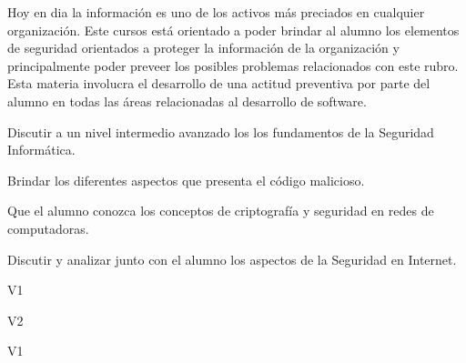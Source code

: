 \begin{syllabus}


\begin{justification}
Hoy en dia la información es uno de los activos más preciados en cualquier organización.
Este cursos está orientado a poder brindar al alumno los elementos de seguridad orientados a proteger la
información de la organización y principalmente poder preveer los posibles problemas relacionados con este rubro.
Esta materia involucra el desarrollo de una actitud preventiva por parte del alumno en todas las áreas
relacionadas al desarrollo de software.
\end{justification}

\begin{goals}
\item Discutir a un nivel intermedio avanzado los los fundamentos de la Seguridad Informática.
\item Brindar los diferentes aspectos que presenta el código malicioso.
\item Que el alumno conozca los conceptos de criptografía y seguridad en redes de computadoras.
\item Discutir y analizar junto con el alumno los aspectos de la Seguridad en Internet.
\end{goals}

\begin{outcomes}{V1}
    \item {}
    \item {}
    \item {}
    \item {}
    \item {}
    \item {}
\end{outcomes}

\begin{outcomes}{V2}
    \item {}
    \item {}
\end{outcomes}

\begin{competences}{V1}
    \item {}
    \item {}
    \item {}
    \item {}
    \item {}
    \item {}
    \item {}
    \item {}
\end{competences}


\end{syllabus}
